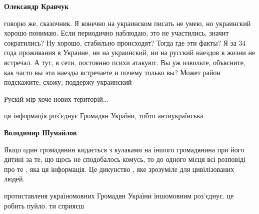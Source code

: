 \begin{itemize}
\begin{itemize}
\textbf{Олександр Кравчук} 

говорю же, сказочник. Я конечно на украинском писать не умею, но украинский
хорошо понимаю. Если периодично наблюдаю, это не участились, значит
сократились? Ну хорошо, стабильно происходят? Тогда где эти факты? Я за 34 года
проживания в Украине, ни на украинский, ни на русский наездов в жизни не
встречал. А тут, в сети, постоянно психи атакуют. Вы уж извольте, объясните,
как часто вы эти наезды встречаете и почему только вы? Может район подскажите,
схожу, поддержу украинский

\end{itemize}

 
Рускій мір хоче нових територій...

 
ця інформація роз'єднує Громадян України, тобто антиукраїнська

\begin{itemize}
 
\textbf{Володимир Шумайлов} 

Якщо один громадянин кидається з кулаками на іншого громадянина при його дитині
за те, що щось не сподобалось комусь, то до одного місця всі розповіді про те ,
яка ця інформація. Це дикунство , яке зрозуміле для цивілізованих людей.


 
протиставленя україномовних Громадян України іншомовним роз'єднує. це робить пуйло. ти сприяєш


\end{itemize}
\end{itemize}
